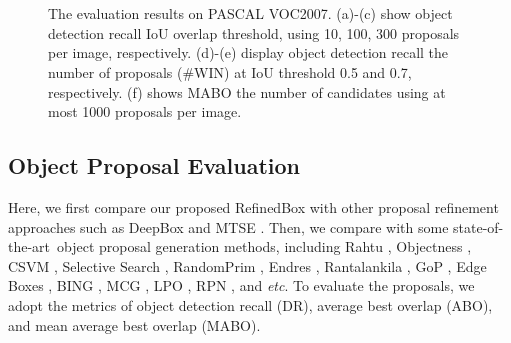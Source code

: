 \documentclass[10pt,twocolumn,letterpaper]{article}
\def\etc{\emph{etc}}
\def\sArt{{state-of-the-art~}}
\begin{document}
\begin{figure}[!htbp]
  \\ \vspace{-0.1in}
  \hspace{.05\linewidth}
  \\ \vspace{-0.1in}
  \caption{The evaluation results on PASCAL VOC2007. (a)-(c) show object
  detection recall \vs IoU overlap threshold, using 10, 100, 300 proposals
  per image, respectively. (d)-(e) display object detection recall \vs the
  number of proposals (\#WIN) at IoU threshold 0.5 and 0.7, respectively.
  (f) shows MABO \vs the number of candidates using at most 1000 proposals
  per image.}
  \label{fig:voc-evaluation}
\end{figure}


\subsection{Object Proposal Evaluation}
%
Here, we first compare our proposed RefinedBox with other proposal refinement
approaches such as DeepBox \cite{kuo2015deepbox} and MTSE \cite{chen2015improving}.
Then, we compare with some \sArt object proposal generation methods, including
Rahtu \cite{rahtu2011learning},
Objectness \cite{alexe2012measuring},
CSVM \cite{zhang2016object},
Selective Search \cite{uijlings2013selective},
RandomPrim \cite{manen2013prime},
Endres \cite{endres2014category},
Rantalankila \cite{rantalankila2014generating},
GoP \cite{krahenbuhl2014geodesic},
Edge Boxes \cite{zitnick2014edge},
BING \cite{cheng2014bing},
MCG \cite{arbelaez2014multiscale},
LPO \cite{krahenbuhl2015learning},
RPN \cite{ren2015faster}, and \etc.
To evaluate the proposals, we adopt the metrics of object detection recall (DR),
average best overlap (ABO), and mean average best overlap (MABO).
\end{document}
